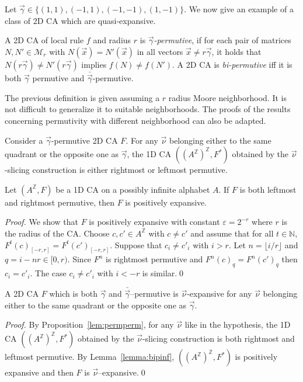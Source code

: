 \documentclass{llncs}
\newcommand{\z}{\ensuremath{\mathbb{Z}}\xspace}
\newcommand{\n}{\ensuremath{\mathbb{N}}\xspace}
\newcommand{\az}{\ensuremath{A^{\mathbb{Z}}}\xspace}
\newcommand{\para}[1]{(#1)}
\newcommand{\nn}{\vec\nu}
\newcommand{\gv}{\vec\gamma}
\newcommand{\xx}{\vec x}
\newcommand{\Mr}{\ensuremath{\mathcal{M}_r}\xspace}
\begin{document}
Let $\gv\in\{(1,1),(-1,1),(-1,-1),(1,-1)\}$.
We now give an example of a class of 2D CA which are quasi-expansive. 
\begin{definition}[Permutivity]
A 2D CA of local rule $f$ and radius $r$ is
\emph{$\gv$-permutive}, if for each pair of matrices
$N,N'\in\Mr$ with $N(\xx)=N'(\xx)$ in all vectors $\xx\neq
r\gv$, it holds that $N(r\gv)\ne N'(r\gv)$ implies
$f(N)\ne f(N')$. A 2D CA is \emph{bi-permutive} iff it is both
$\gv$ permutive and $\bar{\gv}$-permutive.
\end{definition}
The previous definition is given assuming a $r$ radius Moore
neighborhood. It is not difficult to generalize it to suitable
neighborhoods. The proofs of the results concerning permutivity
with different neighborhood can also be adapted.
\begin{proposition}\label{lem:permperm}
Consider a $\gv$-permutive 2D CA $F$. For any $\nn$ belonging either to the same quadrant or the opposite one as $\gv$, the 1D CA 
$\para{(\az)^\z, F^*}$ obtained by
the $\nn$-slicing construction is either rightmost or leftmost permutive.
\end{proposition}
\begin{lemma}
\label{lemma:bipinf} Let $\para{\az,F}$ be a 1D CA on a possibly
infinite alphabet $A$. If $F$ is both leftmost and rightmost
permutive, then $F$ is positively expansive.
\end{lemma}
\begin{proof}
We show that $F$ is positively expansive with constant
$\varepsilon=2^{-r}$ where $r$ is the radius of the CA. Choose
$c,c'\in\az$ with $c\neq c'$ and assume that for all $t\in\n$,
$F^t(c)_{[-r,r]}=F^t(c')_{[-r,r]}$. Suppose that $c_i\neq c'_i$ with
$i>r$. Let $n=\lfloor i/r\rfloor$ and $q=i-nr\in [0,r)$. Since
$F^n$ is rightmost permutive and $F^n(c)_q=F^n(c')_q$ then
$c_i=c'_i$. The case $c_i\neq c'_i$ with $i<-r$ is similar.\qed
\end{proof}
\begin{proposition}
\label{prop:bipexp} A 2D CA $F$ which is both $\gv$ and
$\bar{\gv}$--permutive is $\nn$-expansive for any $\nn$ belonging either to the same quadrant or the opposite one as $\gv$.
\end{proposition}
\begin{proof}
By Proposition~\ref{lem:permperm}, for any $\nn$ like in the hypothesis, the 1D CA $\para{(\az)^\z, F^*}$ obtained by
the $\nn$-slicing construction is both rightmost and leftmost
permutive. By Lemma~\ref{lemma:bipinf}, $\para{(\az)^\z, F^*}$ is
positively expansive and then $F$ is $\nn$--expansive.\qed
\end{proof}
\end{document}
